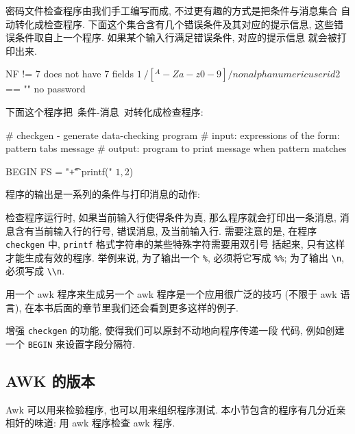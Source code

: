 密码文件检查程序由我们手工编写而成, 不过更有趣的方式是把条件与消息集合
自动转化成检查程序. 下面这个集合含有几个错误条件及其对应的提示信息, 
这些错误条件取自上一个程序. 如果某个输入行满足错误条件, 对应的提示信息
就会被打印出来.
\begin{shell}
    NF != 7                 does not have 7 fields
    $1 ~ /[^A-Za-z0-9]/     nonalphanumeric user id
    $2 == ""                no password
\end{shell}
下面这个程序把\ \mbox{条件}\mbox{-}消息\ 对转化成检查程序:
\begin{awkcode}
    # checkgen - generate data-checking program
    #     input:  expressions of the form: pattern tabs message
    #     output: program to print message when pattern matches
    
    BEGIN { FS = "\t+" }
    { printf("%
          $1, $2)
    }
\end{awkcode}
程序的输出是一系列的条件与打印消息的动作:
检查程序运行时, 如果当前输入行使得条件为真, 那么程序就会打印出一条消息, 
消息含有当前输入行的行号, 错误消息, 及当前输入行. 需要注意的是, 在程序
\verb'checkgen' 中, \verb'printf' 格式字符串的某些特殊字符需要用双引号
括起来, 只有这样才能生成有效的程序. 举例来说, 为了输出一个 \verb'%',
必须将它写成 \verb'%%'; 为了输出 \verb'\n', 必须写成 \verb'\\n'.

用一个 awk 程序来生成另一个 awk 程序是一个应用很广泛的技巧 (不限于 awk
语言), 在本书后面的章节里我们还会看到更多这样的例子.

\begin{exercise}
    增强 \verb'checkgen' 的功能, 使得我们可以原封不动地向程序传递一段
    代码, 例如创建一个 \verb'BEGIN' 来设置字段分隔符.
\end{exercise}

\subsection{AWK 的版本}
\label{subsec:which_version_of_awk}

Awk 可以用来检验程序, 也可以用来组织程序测试. 本小节包含的程序有几分近亲
相奸的味道: 用 awk 程序检查 awk 程序.

